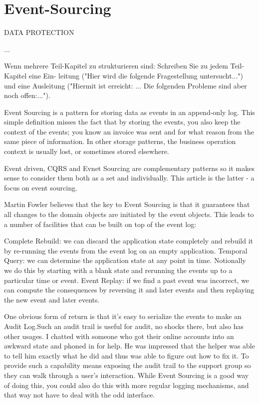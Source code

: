 %
\chapter{Event-Sourcing}

DATA PROTECTION

...\citep{fowler2022es}

Wenn mehrere Teil-Kapitel zu strukturieren sind: Schreiben Sie zu jedem Teil-Kapitel eine Ein- leitung ("Hier wird die folgende Fragestellung untersucht...") und eine Ausleitung ("Hiermit ist erreicht: ... Die folgenden Probleme sind aber noch offen:...").

Event Sourcing is a pattern for storing data as events in an append-only log. This simple definition misses the fact that by storing the events, you also keep the context of the events; you know an invoice was sent and for what reason from the same piece of information. In other storage patterns, the business operation context is usually lost, or sometimes stored elsewhere. %

Event driven, CQRS and Evnet Sourcing are complementary patterns so it makes sense to consider them both as a set and individually. This article is the latter - a focus on event sourcing.



Martin Fowler believes that the key to Event Sourcing is that it guarantees that all changes to the domain objects are initiated by the event objects. This leads to a number of facilities that can be built on top of the event log:

Complete Rebuild: we can discard the application state completely and rebuild it by re-running the events from the event log on an empty application.
Temporal Query: we can determine the application state at any point in time. Notionally we do this by starting with a blank state and rerunning the events up to a particular time or event.
Event Replay: if we find a past event was incorrect, we can compute the consequences by reversing it and later events and then replaying the new event and later events. %

One obvious form of return is that it's easy to serialize the events to make an Audit Log.Such an audit trail is useful for audit, no shocks there, but also has other usages. I chatted with someone who got their online accounts into an awkward state and phoned in for help. He was impressed that the helper was able to tell him exactly what he did and thus was able to figure out how to fix it. To provide such a capability means exposing the audit trail to the support group so they can walk through a user's interaction. While Event Sourcing is a good way of doing this, you could also do this with more regular logging mechanisms, and that way not have to deal with the odd interface. %

